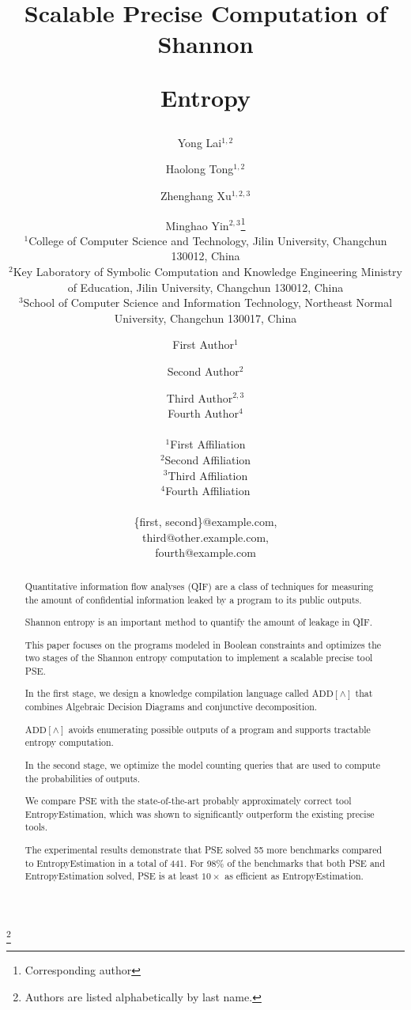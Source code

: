 \documentclass{article}
\title{Scalable Precise Computation of Shannon

	Entropy}
\author{

	Yong Lai$^{1,2}$

	\and

	Haolong Tong$^{1,2}$

	\and

	Zhenghang Xu$^{1,2,3}$

	\and

	Minghao Yin$^{2,3}$\thanks{Corresponding author} %

	\affiliations

	$^1$College of Computer Science and Technology, Jilin University, Changchun 130012, China\\

	$^2$Key Laboratory of Symbolic Computation and Knowledge Engineering  Ministry of Education, Jilin University, Changchun 130012, China\\

	$^3$School of Computer Science and Information Technology, Northeast Normal University, Changchun 130017, China\\




}
\author{

	First Author$^1$

	\and

	Second Author$^2$\and

	Third Author$^{2,3}$\And

	Fourth Author$^4$\\

	\affiliations

	$^1$First Affiliation\\

	$^2$Second Affiliation\\

	$^3$Third Affiliation\\

	$^4$Fourth Affiliation\\

	\emails

	\{first, second\}@example.com,

	third@other.example.com,

	fourth@example.com

}
\newcommand{\ADDAND}{\ensuremath{\text{ADD}[\land]}\xspace}
\newcommand{\unnumberedfootnote}[1]{%

	\begingroup


	\edef\oldfootnote{\thefootnote}%


	\setcounter{footnote}{1000}%


	\renewcommand{\thefootnote}{}%


	\footnote{#1}%


	\setcounter{footnote}{\oldfootnote}%

	\endgroup

}
\begin{document}
	

	\maketitle

	\begin{abstract}

		Quantitative information flow analyses (QIF) are a class of techniques for measuring the amount of confidential information leaked by a program to its public outputs. 

		Shannon entropy is an important method to quantify the amount of leakage in QIF.

		This paper focuses on the programs modeled in Boolean constraints and optimizes the two stages of the Shannon entropy computation to implement a scalable precise tool PSE.

		In the first stage, we design a knowledge compilation language called \ADDAND that combines Algebraic Decision Diagrams and conjunctive decomposition.

		\ADDAND avoids enumerating possible outputs of a program and supports tractable entropy computation. 

		In the second stage, we optimize the model counting queries that are used to compute the probabilities of outputs. 

		We compare PSE with the state-of-the-art probably approximately correct tool EntropyEstimation, which was shown to significantly outperform the existing precise tools.

		The experimental results demonstrate that PSE solved 55 more benchmarks compared to EntropyEstimation in a total of 441. For 98\% of the benchmarks that both PSE and EntropyEstimation solved, PSE is at least $10\times$ as efficient as EntropyEstimation.


	\end{abstract}

	

	

	\unnumberedfootnote{Authors are listed alphabetically by last name.}

	

	

	

	

	
\end{document}
